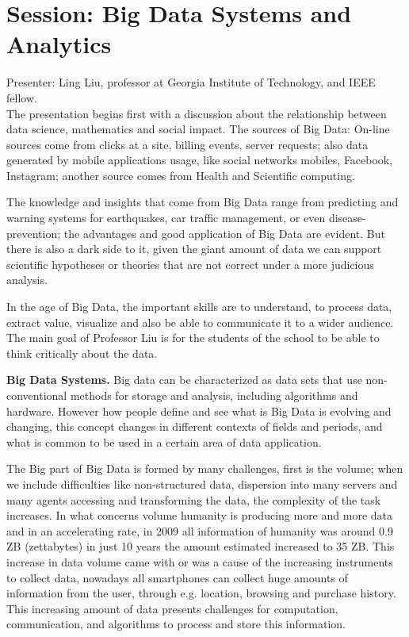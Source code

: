 \documentclass[9pt,a4paper]{article}
\begin{document}
\section*{Session: Big Data Systems and Analytics}

Presenter: Ling Liu, professor at Georgia Institute of Technology, and IEEE fellow.\\

The presentation begins first with a discussion about the relationship between data science, mathematics and social impact. 
The sources of Big Data: On-line sources come from clicks at a site, billing events, server requests; also data generated by mobile applications usage, like social networks mobiles, Facebook, Instagram; another source comes from Health and Scientific computing. 

The knowledge and insights that come from Big Data range from predicting and warning systems for earthquakes, car traffic management, or even disease-prevention; the advantages and good application of Big Data are evident. But there is also a dark side to it, given the giant amount of data we can support scientific hypotheses or theories that are not correct under a more judicious analysis.

In the age of Big Data, the important skills are to understand, to process data, extract value, visualize and also be able to communicate it to a wider audience. The main goal of Professor Liu is for the students of the school to be able to think critically about the data. 

   
\textbf{Big Data Systems.} Big data can be characterized as data sets that use non-conventional methods for storage and analysis, including algorithms and hardware. However how people define and see what is Big Data is evolving and changing, this concept changes in different contexts of fields and periods, and what is common to be used in a certain area of data application. 

The Big part of Big Data is formed by many challenges, first is the volume; when we include difficulties like non-structured data, dispersion into many servers and many agents accessing and transforming the data, the complexity of the task increases. In what concerns volume humanity is producing more and more data and in an accelerating rate, in 2009 all information of humanity was around 0.9 ZB (zettabytes) in just 10 years the amount estimated increased to 35 ZB. This increase in data volume came with or was a cause of the increasing instruments to collect data, nowadays all smartphones can collect huge amounts of information from the user, through e.g. location, browsing and purchase history. This increasing amount of data presents challenges for computation, communication, and algorithms to process and store this information. 
\end{document}
